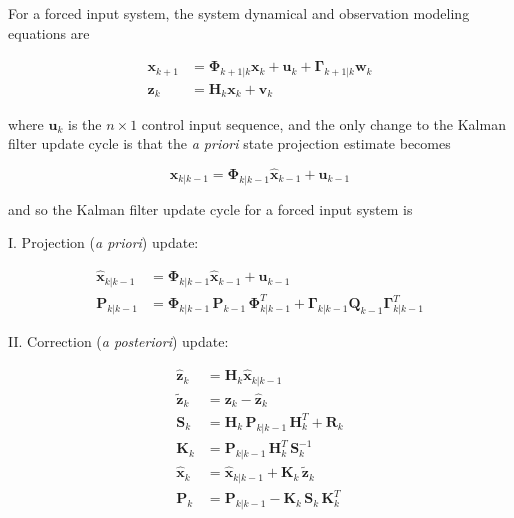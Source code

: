 For a forced input system, the system dynamical and observation modeling equations are

\begin{equation*}
    \begin{aligned}
        \mathbf{x}_{k+1} &= \mathbf{\Phi}_{k+1|k} \mathbf{x}_k + \mathbf{u}_k + \mathbf{\Gamma}_{k+1|k} \mathbf{w}_k \\
        \mathbf{z}_k &= \mathbf{H}_k \mathbf{x}_k + \mathbf{v}_k
    \end{aligned}
\end{equation*}

where $\mathbf{u}_k$ is the $n \times 1$ control input sequence, and the only change to
the Kalman filter update cycle is that the \textit{a priori} state projection estimate becomes

\begin{equation*}
    \hat{\mathbf{x}}_{k|k-1} = \mathbf{\Phi}_{k|k-1} \hat{\mathbf{x}}_{k-1} + \mathbf{u}_{k-1}
\end{equation*}

and so the Kalman filter update cycle for a forced input system is

I. Projection (\textit{a priori}) update:

\begin{equation*}
    \begin{aligned}
        \hat{\mathbf{x}}_{k|k-1} &= \mathbf{\Phi}_{k|k-1} \hat{\mathbf{x}}_{k-1} + \mathbf{u}_{k-1} \\
        \mathbf{P}_{k|k-1} &= \mathbf{\Phi}_{k|k-1} \, \mathbf{P}_{k-1} \, \mathbf{\Phi}_{k|k-1}^T + \mathbf{\Gamma}_{k|k-1} \mathbf{Q}_{k-1} \mathbf{\Gamma}_{k|k-1}^T
    \end{aligned}
\end{equation*}

II. Correction (\textit{a posteriori}) update:

\begin{equation*}
    \begin{aligned}
        \hat{\mathbf{z}}_k &= \mathbf{H}_k \hat{\mathbf{x}}_{k|k-1} \\
        \tilde{\mathbf{z}}_k &= \mathbf{z}_k - \hat{\mathbf{z}}_k \\
        \mathbf{S}_{k} &= \mathbf{H}_{k} \, \mathbf{P}_{k|k-1} \, \mathbf{H}_{k}^T + \mathbf{R}_{k} \\
        \mathbf{K}_{k} &= \mathbf{P}_{k|k-1} \, \mathbf{H}_{k}^T \, \mathbf{S}_{k}^{-1} \\
        \hat{\mathbf{x}}_k &= \hat{\mathbf{x}}_{k|k-1} +\mathbf{K}_k \, \tilde{\mathbf{z}}_k \\
        \mathbf{P}_k &= \mathbf{P}_{k|k-1} - \mathbf{K}_{k} \, \mathbf{S}_{k} \, \mathbf{K}_{k}^T
    \end{aligned}
\end{equation*}

